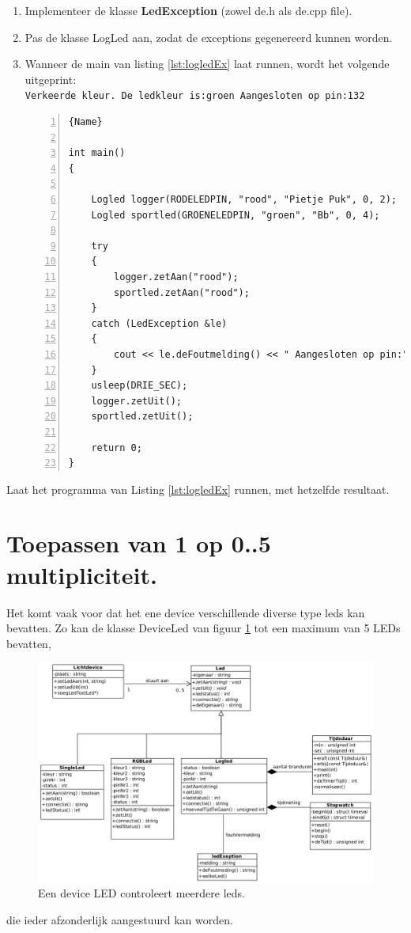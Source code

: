 \begin{enumerate}
	\item Implementeer de klasse \textbf{LedException} (zowel de.h als de.cpp file).
	\item Pas de klasse LogLed aan, zodat de exceptions gegenereerd kunnen worden.
	\item Wanneer de main van listing \ref{lst:logledEx} laat runnen,
wordt het volgende uitgeprint:\\
\texttt{Verkeerde kleur. De ledkleur is:groen Aangesloten op pin:132}
\begin{lstlisting}[caption=Twee objecten van de klasse \texttt{LogLed}. ,frame=trbl,firstnumber=1,numbers=left,label={lst:logledEx}]{Name}
	
int main()
{
	
	Logled logger(RODELEDPIN, "rood", "Pietje Puk", 0, 2);
	Logled sportled(GROENELEDPIN, "groen", "Bb", 0, 4);
	
	try
	{
		logger.zetAan("rood");
		sportled.zetAan("rood");
	}
	catch (LedException &le)
	{
		cout << le.deFoutmelding() << " Aangesloten op pin:" << le.welkeLed()->connectie() << endl;
	}
	usleep(DRIE_SEC);
	logger.zetUit();
	sportled.zetUit();
	
	return 0;
}
\end{lstlisting}		
\end{enumerate}
Laat het programma van Listing \ref{lst:logledEx} runnen, met hetzelfde resultaat.

\section{Toepassen van 1 op  0..5 multipliciteit.}
Het komt vaak voor dat het ene device verschillende diverse type leds kan bevatten. Zo kan de klasse DeviceLed van figuur \ref{fig:devled} tot een maximum van 5 LEDs bevatten,   
\begin{figure}[h!]
	\captionsetup{justification=centering}
	\includegraphics[width=1 \linewidth]{figuren/deviceled}     
	\centering
	\caption{Een device LED controleert meerdere leds.}
	\label{fig:devled}
\end{figure} 
die ieder afzonderlijk aangestuurd kan worden. 

